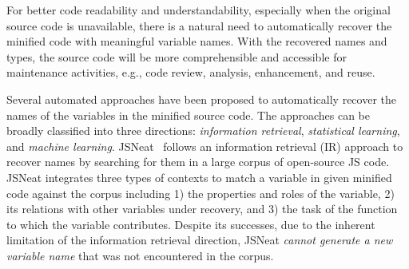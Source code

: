 

%
%

For better code readability and understandability, especially when the
original source code is unavailable, there is a natural need to
automatically recover the minified code with meaningful variable
names. With the recovered names and types, the source code will be
more comprehensible and accessible for maintenance activities, e.g.,
code review, analysis, enhancement, and reuse.




Several automated approaches have been proposed to automatically
recover the names of the variables in the minified source code.  The
approaches can be broadly classified into three directions: {\em
  information retrieval}, {\em statistical learning}, and {\em machine
  learning}.  JSNeat~\cite{icse19} follows an information retrieval
(IR) approach to recover names by searching for them in a large corpus
of open-source JS code. JSNeat integrates three types of contexts to
match a variable in given minified code against the corpus including
1) the properties and roles of the variable, 2)
its relations with other variables under
recovery, and 3)
the task of the function to which the variable contributes.  Despite
its successes, due to the inherent limitation of the information
retrieval direction, JSNeat {\em cannot generate a new variable name}
that was not encountered in the corpus.

